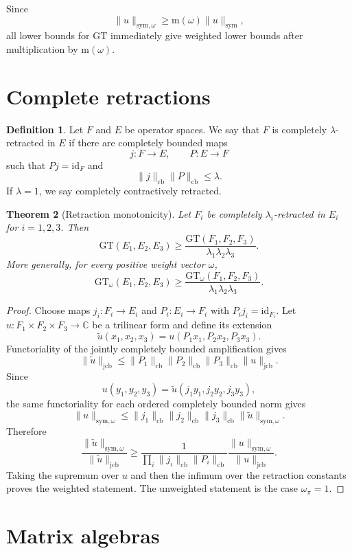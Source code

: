 \documentclass[11pt]{amsart}
\newtheorem{theorem}{Theorem}[section]
\theoremstyle{definition}
\newtheorem{definition}[theorem]{Definition}
\newcommand{\C}{\mathbb C}
\newcommand{\cb}{\mathrm{cb}}
\newcommand{\jcb}{\mathrm{jcb}}
\newcommand{\sym}{\mathrm{sym}}
\newcommand{\id}{\mathrm{id}}
\newcommand{\minw}{\mathrm{m}}
\newcommand{\GT}{\mathrm{GT}}
\begin{document}
Since
\[
   \|u\|_{\sym,\omega}\ge \minw(\omega)\|u\|_{\sym},
\]
all lower bounds for $\GT$ immediately give weighted lower bounds after
multiplication by $\minw(\omega)$.

\section{Complete retractions}

\begin{definition}
Let $F$ and $E$ be operator spaces. We say that $F$ is completely
$\lambda$-retracted in $E$ if there are completely bounded maps
\[
   j:F\to E,\qquad P:E\to F
\]
such that $Pj=\id_F$ and
\[
   \|j\|_{\cb}\|P\|_{\cb}\le \lambda .
\]
If $\lambda=1$, we say completely contractively retracted.
\end{definition}

\begin{theorem}[Retraction monotonicity]
\label{thm:retraction}
Let $F_i$ be completely $\lambda_i$-retracted in $E_i$ for $i=1,2,3$. Then
\[
   \GT(E_1,E_2,E_3)
   \ge
   \frac{\GT(F_1,F_2,F_3)}{\lambda_1\lambda_2\lambda_3}.
\]
More generally, for every positive weight vector $\omega$,
\[
   \GT_\omega(E_1,E_2,E_3)
   \ge
   \frac{\GT_\omega(F_1,F_2,F_3)}{\lambda_1\lambda_2\lambda_3}.
\]
\end{theorem}

\begin{proof}
Choose maps $j_i:F_i\to E_i$ and $P_i:E_i\to F_i$ with $P_i j_i=\id_{F_i}$.
Let $u:F_1\times F_2\times F_3\to\C$ be a trilinear form and define its
extension
\[
   \widetilde u(x_1,x_2,x_3)
   =
   u(P_1x_1,P_2x_2,P_3x_3).
\]
Functoriality of the jointly completely bounded amplification gives
\[
   \|\widetilde u\|_{\jcb}
   \le
   \|P_1\|_{\cb}\|P_2\|_{\cb}\|P_3\|_{\cb}\|u\|_{\jcb}.
\]
Since
\[
   u(y_1,y_2,y_3)
   =
   \widetilde u(j_1y_1,j_2y_2,j_3y_3),
\]
the same functoriality for each ordered completely bounded norm gives
\[
   \|u\|_{\sym,\omega}
   \le
   \|j_1\|_{\cb}\|j_2\|_{\cb}\|j_3\|_{\cb}
   \|\widetilde u\|_{\sym,\omega}.
\]
Therefore
\[
   \frac{\|\widetilde u\|_{\sym,\omega}}{\|\widetilde u\|_{\jcb}}
   \ge
   \frac{1}{\prod_i \|j_i\|_{\cb}\|P_i\|_{\cb}}
   \frac{\|u\|_{\sym,\omega}}{\|u\|_{\jcb}}.
\]
Taking the supremum over $u$ and then the infimum over the retraction
constants proves the weighted statement. The unweighted statement is the case
$\omega_\pi=1$.
\end{proof}

\section{Matrix algebras}
\end{document}
